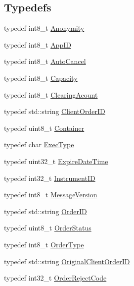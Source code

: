 \subsection*{Typedefs}
\begin{DoxyCompactItemize}
\item 
typedef int8\+\_\+t \hyperlink{namespaceMetal_1_1LSE_a0c110efde74bd7f4315615c477dac047}{Anonymity}
\item 
typedef int8\+\_\+t \hyperlink{namespaceMetal_1_1LSE_a89c70e0ff27a052a68a981159295a760}{App\+I\+D}
\item 
typedef int8\+\_\+t \hyperlink{namespaceMetal_1_1LSE_a28e46ba33ca9d641a9ea0c63a2e35141}{Auto\+Cancel}
\item 
typedef int8\+\_\+t \hyperlink{namespaceMetal_1_1LSE_aff7400475e278748e213fefa47bb9b99}{Capacity}
\item 
typedef int8\+\_\+t \hyperlink{namespaceMetal_1_1LSE_ae1f2b67d6be84798adfd29525ee0a697}{Clearing\+Acount}
\item 
typedef std\+::string \hyperlink{namespaceMetal_1_1LSE_a7f5f027430e2d08dcf1a5ccba4ea7bc6}{Client\+Order\+I\+D}
\item 
typedef uint8\+\_\+t \hyperlink{namespaceMetal_1_1LSE_ad218510a226f263117710c146016b65b}{Container}
\item 
typedef char \hyperlink{namespaceMetal_1_1LSE_ad5d18db60c5d9498cab95aa9e19a416a}{Exec\+Type}
\item 
typedef uint32\+\_\+t \hyperlink{namespaceMetal_1_1LSE_a62b04587ecad5f88a7fbd626194b3c28}{Expire\+Date\+Time}
\item 
typedef int32\+\_\+t \hyperlink{namespaceMetal_1_1LSE_a5280aa41aaa4433df351e733a23ecd14}{Instrument\+I\+D}
\item 
typedef int8\+\_\+t \hyperlink{namespaceMetal_1_1LSE_a1576ab352ec9a06e5103c45324cf7d97}{Message\+Version}
\item 
typedef std\+::string \hyperlink{namespaceMetal_1_1LSE_a30b8c9f132779cac1a35919835725059}{Order\+I\+D}
\item 
typedef uint8\+\_\+t \hyperlink{namespaceMetal_1_1LSE_aaa5d42acc71915dbdbc74bf7b7db958e}{Order\+Status}
\item 
typedef int8\+\_\+t \hyperlink{namespaceMetal_1_1LSE_aff01f13ff9de4cacdd0436f6956df4fb}{Order\+Type}
\item 
typedef std\+::string \hyperlink{namespaceMetal_1_1LSE_a28d9de72a77b3eab8551831696a678c1}{Original\+Client\+Order\+I\+D}
\item 
typedef int32\+\_\+t \hyperlink{namespaceMetal_1_1LSE_a4e9785c206e1217535a3c9e223e6b04d}{Order\+Reject\+Code}

\end{DoxyCompactItemize}
